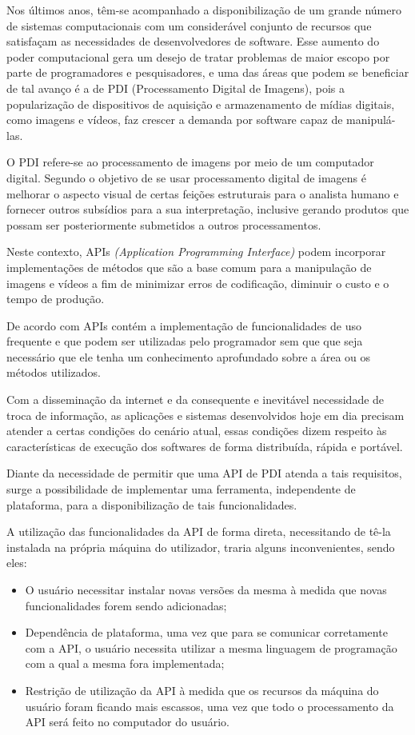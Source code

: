 \documentclass[12pt]{article}
\begin{document}
Nos últimos anos, têm-se acompanhado a disponibilização de um grande número de sistemas 
computacionais com um considerável conjunto de recursos que satisfaçam as necessidades de 
desenvolvedores de software. Esse aumento do poder computacional gera um desejo de tratar 
problemas de maior escopo por parte de programadores e pesquisadores, e uma das áreas que podem 
se beneficiar de tal avanço é a de PDI (Processamento Digital de Imagens), pois a popularização 
de dispositivos de aquisição e armazenamento de mídias digitais, como imagens e vídeos, faz 
crescer a demanda por software capaz de manipulá-las.

O PDI refere-se ao processamento de imagens por meio de um computador digital. Segundo \cite{spring} o objetivo de se usar processamento digital de imagens é melhorar o aspecto visual de certas feições estruturais para o analista humano e fornecer outros subsídios para a sua interpretação, inclusive gerando produtos que possam ser posteriormente submetidos a outros processamentos. 

Neste contexto, APIs \textit{(Application Programming Interface)} podem incorporar implementações de métodos que são a base comum para a manipulação de imagens e 
vídeos a fim de minimizar erros de codificação, diminuir o custo e o tempo de produção. 

De acordo com \cite{pressman:16, sommerville:11} APIs contém a implementação de funcionalidades de uso frequente e que podem ser utilizadas pelo
programador sem que que seja necessário que ele tenha um conhecimento aprofundado sobre a área ou os métodos utilizados.

Com a disseminação da internet e da consequente e inevitável necessidade de troca de informação, 
as aplicações e sistemas desenvolvidos hoje em dia precisam 
atender a certas condições do cenário atual, essas condições dizem respeito às características 
de execução dos softwares de forma distribuída, rápida e portável. 

Diante da necessidade de permitir que uma API de PDI atenda a tais requisitos, surge a
possibilidade de implementar uma ferramenta, independente de plataforma, para a
disponibilização de tais funcionalidades. 

A utilização das funcionalidades da API de forma direta, necessitando de tê-la instalada na própria máquina do utilizador, traria alguns inconvenientes, sendo eles:

\begin{itemize}
	\item O usuário necessitar instalar novas versões da mesma à medida que novas funcionalidades forem sendo adicionadas;
	\item Dependência de plataforma, uma vez que para se comunicar corretamente com a API, o usuário necessita utilizar a mesma linguagem de programação com a qual a mesma fora implementada;
	\item Restrição de utilização da API à medida que os recursos da máquina do usuário foram ficando mais escassos, uma vez que todo o processamento da API será feito no computador do usuário.
\end{itemize}
\end{document}
